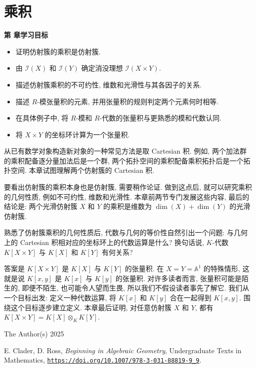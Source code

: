 \chapter{乘积}\label{chap:products}

\noindent\textbf{第 \thechapter{} 章学习目标}
\begin{itemize}
  \item 证明仿射簇的乘积是仿射簇.
  \item 由 $\mathcal{I}(X)$ 和 $\mathcal{I}(Y)$ 确定消没理想 $\mathcal{I}(X\times Y)$.
  \item 描述仿射簇乘积的不可约性, 维数和光滑性与其各因子的关系.
  \item 描述 $R$-模张量积的元素, 并用张量积的规则判定两个元素何时相等.
  \item 在具体例子中, 将 $R$-模和 $R$-代数的张量积与更熟悉的模和代数认同.
  \item 将 $X\times Y$ 的坐标环计算为一个张量积.
\end{itemize}

从已有数学对象构造新对象的一种常见方法是取 Cartesian 积. 例如, 两个加法群的乘积配备逐分量加法后是一个群, 两个拓扑空间的乘积配备乘积拓扑后是一个拓扑空间. 本章试图理解两个仿射簇的 Cartesian 积.

要看出仿射簇的乘积本身也是仿射簇, 需要稍作论证. 做到这点后, 就可以研究乘积的几何性质, 例如不可约性, 维数和光滑性. 本章前两节专门发展这些内容, 最后的结论是: 两个光滑仿射簇 $X$ 和 $Y$ 的乘积是维数为 $\dim(X)+\dim(Y)$ 的光滑仿射簇.

熟悉了仿射簇乘积的几何性质后, 代数与几何的等价性自然引出一个问题: 与几何上的 Cartesian 积相对应的坐标环上的代数运算是什么? 换句话说, $K$-代数 $K[X\times Y]$ 与 $K[X]$ 和 $K[Y]$ 有何关系?

答案是 $K[X\times Y]$ 是 $K[X]$ 与 $K[Y]$ 的张量积. 在 $X=Y=\mathbb{A}^{1}$ 的特殊情形, 这就是说 $K[x,y]$ 是 $K[x]$ 与 $K[y]$ 的张量积. 对许多读者而言, 张量积可能是陌生的, 即便不陌生, 也可能令人望而生畏, 所以我们不假设读者事先了解它. 我们从一个目标出发: 定义一种代数运算, 将 $K[x]$ 和 $K[y]$ 合在一起得到 $K[x,y]$. 围绕这个目标逐步建立定义. 本章最后证明, 对任意仿射簇 $X$ 和 $Y$, 都有 $K[X\times Y]=K[X]\otimes_{K}K[Y]$.

\par\smallskip
{\footnotesize
\noindent\textcopyright{} The Author(s) 2025\par
\noindent E. Clader, D. Ross, \emph{Beginning in Algebraic Geometry}, Undergraduate Texts in Mathematics,
\href{https://doi.org/10.1007/978-3-031-88819-9_9}{\nolinkurl{https://doi.org/10.1007/978-3-031-88819-9_9}}.\par}
